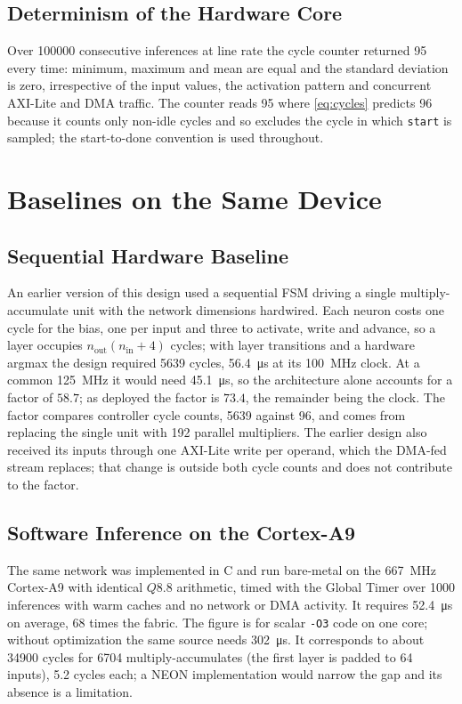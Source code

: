 \documentclass[pdflatex,sn-mathphys-num,iicol]{sn-jnl}
\begin{document}
\subsection{Determinism of the Hardware Core}
\label{sec:determinism}
Over \num{100000} consecutive inferences at line rate the cycle counter returned
95 every time: minimum, maximum and mean are equal and the standard deviation is
zero, irrespective of the input values, the activation pattern and concurrent
AXI-Lite and DMA traffic. The counter reads 95 where \eqref{eq:cycles} predicts
96 because it counts only non-idle cycles and so excludes the cycle in which
\texttt{start} is sampled; the start-to-done convention is used throughout.

\section{Baselines on the Same Device}
\label{sec:baselines}
\subsection{Sequential Hardware Baseline}
\label{sec:baseline}
An earlier version of this design used a
sequential FSM driving a single multiply-accumulate unit with the network
dimensions hardwired. Each neuron costs one cycle for the bias, one per input
and three to activate, write and advance, so a layer occupies
$n_{\text{out}}(n_{\text{in}}+4)$ cycles; with layer transitions and a hardware
argmax the design required \num{5639} cycles, \SI{56.4}{\micro\second} at its
\SI{100}{\mega\hertz} clock. At a common \SI{125}{\mega\hertz} it would need
\SI{45.1}{\micro\second}, so the architecture alone accounts for a factor of
$58.7$; as deployed the factor is $73.4$, the remainder being the clock. The
factor compares controller cycle counts, \num{5639} against 96, and comes from
replacing the single unit with 192 parallel multipliers. The earlier design
also received its inputs through one AXI-Lite write per operand, which the
DMA-fed stream replaces; that change is outside both cycle counts and does not
contribute to the factor.

\subsection{Software Inference on the Cortex-A9}
\label{sec:arm_baseline}
The same network was implemented in C and run bare-metal on the
\SI{667}{\mega\hertz} Cortex-A9 with identical $Q8.8$ arithmetic, timed with the
Global Timer over \num{1000} inferences with warm caches and no network or DMA
activity. It requires \SI{52.4}{\micro\second} on average, 68 times the fabric.
The figure is for scalar \texttt{-O3} code on one core; without optimization the
same source needs \SI{302}{\micro\second}. It corresponds to about \num{34900}
cycles for 6704 multiply-accumulates (the first layer is padded to 64 inputs),
5.2 cycles each; a NEON implementation would narrow the gap and its absence is
a limitation.
\end{document}
